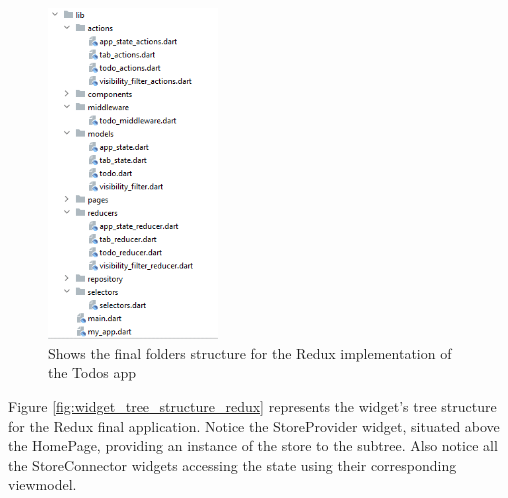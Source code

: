 \begin{figure}[H]
    \centering
    \includegraphics[width=0.4\textwidth]{Images/struttura_cartelle_redux.png}
    \caption{Shows the final folders structure for the Redux implementation of the Todos app}
    \label{fig:struttura_cartelle_redux}
\end{figure}

Figure \ref{fig:widget_tree_structure_redux} represents the widget's tree structure for the Redux final application. Notice the StoreProvider widget, situated above the HomePage, providing an instance of the store to the subtree. Also notice all the StoreConnector widgets accessing the state using their corresponding viewmodel.


